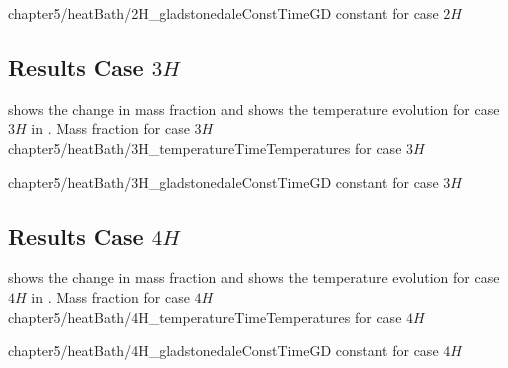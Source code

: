     {chapter5/heatBath/2H_gladstonedaleConstTime}{\gls{GD}
    constant for case $2H$\label{fig:2HGladstoneDaleConst}}


    \subsection{Results Case $3H$ \label{sub:case3H}}
         shows the change in mass fraction and
     shows the temperature evolution for case $3H$
    in .
        {Mass fraction for case $3H$\label{fig:3HMassFractionNeutral}} 
        {chapter5/heatBath/3H_temperatureTime}{Temperatures for case $3H$\label{fig:3HTemperatures}}

    {chapter5/heatBath/3H_gladstonedaleConstTime}{\gls{GD}
    constant for case $3H$\label{fig:3HGladstoneDaleConst}}


    \subsection{Results Case $4H$ \label{sub:case4H}}
         shows the change in mass fraction and
     shows the temperature evolution for case $4H$
    in .
        {Mass fraction for case $4H$\label{fig:4HMassFractionNeutral}} 
        {chapter5/heatBath/4H_temperatureTime}{Temperatures for case $4H$\label{fig:4HTemperatures}}

    {chapter5/heatBath/4H_gladstonedaleConstTime}{\gls{GD}
    constant for case $4H$\label{fig:4HGladstoneDaleConst}}

